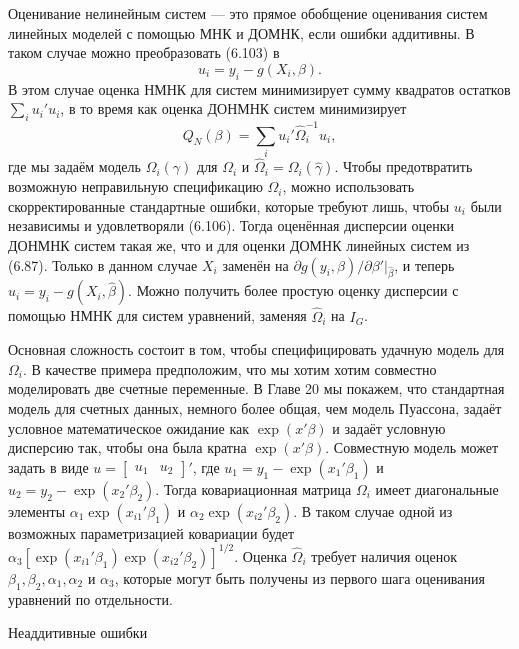 Оценивание нелинейным систем --- это прямое обобщение оценивания систем линейных моделей с помощью МНК и ДОМНК, если ошибки аддитивны. В таком случае можно преобразовать (6.103) в
\begin{equation}
u_i = y_i - g(X_i,\beta).
\end{equation}
В этом случае оценка НМНК для систем минимизирует сумму квадратов остатков $\sum_i u_i'u_i$, в то время как оценка ДОНМНК систем минимизирует
\begin{equation}
Q_N(\beta) = \sum_i u_i'\hat{\Omega}_i^{-1} u_i, 
\end{equation}
где мы задаём модель $\Omega_i(\gamma)$ для $\Omega_i$ и $\hat{\Omega}_i = \Omega_i(\hat{\gamma})$. Чтобы  предотвратить возможную неправильную спецификацию $\Omega_i$, можно использовать скорректированные стандартные ошибки, которые требуют лишь, чтобы $u_i$ были независимы и удовлетворяли (6.106). Тогда оценённая дисперсии оценки ДОНМНК систем такая же, что и для оценки ДОМНК линейных систем из (6.87). Только в данном случае $X_i$ заменён на $\partial{g(y_i,\beta)}/\partial{\beta'}|_{\hat{\beta}}$, и теперь $\hat{u}_i = y_i - g(X_i,\hat{\beta})$. Можно получить более простую оценку дисперсии с помощью НМНК для систем уравнений, заменяя $\hat{\Omega}_i$ на $I_G$.

Основная сложность состоит в том, чтобы специфицировать удачную модель для $\Omega_i$. В качестве примера предположим, что мы хотим хотим совместно моделировать две счетные переменные. В Главе 20 мы покажем, что стандартная модель для счетных данных, немного более общая, чем модель Пуассона, задаёт условное математическое ожидание как $\exp(x'\beta)$ и задаёт условную дисперсию так, чтобы она была кратна $\exp(x'\beta)$. Совместную модель может задать в виде $u = \begin{bmatrix} u_1 & u_2 \end{bmatrix}'$, где $u_1 = y_1 - \exp(x_1'\beta_1)$ и $u_2 = y_2 - \exp(x_2'\beta_2)$. Тогда ковариационная матрица $\Omega_i$ имеет диагональные элементы $\alpha_1 \exp(x_{i1}'\beta_1)$ и $\alpha_2 \exp(x_{i2}'\beta_2)$. В таком случае одной из возможных параметризацией ковариации будет $\alpha_3[\exp(x_{i1}'\beta_1)\exp(x_{i2}'\beta_2)]^{1/2}$. Оценка $\hat{\Omega}_i$ требует наличия оценок $\beta_1, \beta_2, \alpha_1, \alpha_2$ и $\alpha_3$, которые могут быть получены из первого шага оценивания  уравнений по отдельности.

\begin{center}
Неаддитивные ошибки
\end{center}

